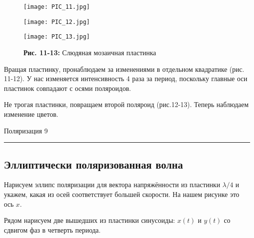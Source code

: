 \documentclass[12pt,a4paper]{scrartcl}
\begin{document}
 	
 	 \begin{figure}[h]
 		\begin{minipage}{0.3333\linewidth}
 			\begin{center}
 				\texttt{[image: PIC\_11.jpg]}
 			\end{center}
 		\end{minipage}
 		\begin{minipage}{0.3333\linewidth}
 			\begin{center}
 				\texttt{[image: PIC\_12.jpg]}
 			\end{center}
 		\end{minipage}
 		\begin{minipage}{0.3333\linewidth}
 			\begin{center}
 				\texttt{[image: PIC\_13.jpg]}
 			\end{center}
 		\end{minipage}
 		\begin{center}
 			\textbf{Рис. 11-13:} Слюдяная мозаичная пластинка
 		\end{center}
 	\end{figure}
 	
 	
 	Вращая пластинку, пронаблюдаем за изменениями в отдельном квадратике (рис. 11-12). У нас изменяется интенсивность 4 раза за период, поскольку главные оси пластинок совпадают с осями поляроидов.
 	
 	Не трогая пластинки, повращаем второй поляроид (рис.12-13). Теперь наблюдаем изменение цветов. 
 	
	\newpage
	
	
	\begin{flushleft}
		\footnotesize{Поляризация} \hspace{\fill} \footnotesize{9}
		\\[-0.3cm]\noindent\rule{\textwidth}{0.3pt}
	\end{flushleft}

	\subsection{Эллиптически поляризованная волна}

	Нарисуем эллипс поляризации для вектора напряжённости из пластинки $ \lambda/4 $ и укажем, какая из осей соответствует большей скорости. На нашем рисунке это ось $ x $.
	
	Рядом нарисуем две вышедших из пластинки синусоиды: $ x(t) $ и $ y(t) $ со сдвигом фаз в четверть периода. 
	
\end{document}
